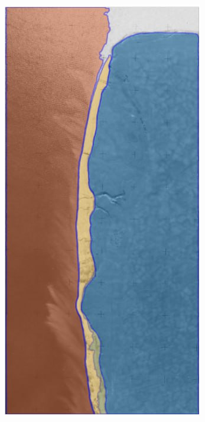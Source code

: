 \documentclass[10pt]{beamer}
\begin{document}
\begin{frame}
\begin{columns}
\begin{column}{0.25\linewidth}
    \end{column}
    \begin{column}{0.25\linewidth}
      \includegraphics[width=1\linewidth]{sa-photo-result.png}

\end{column}
\end{columns}
\end{frame}
\end{document}
